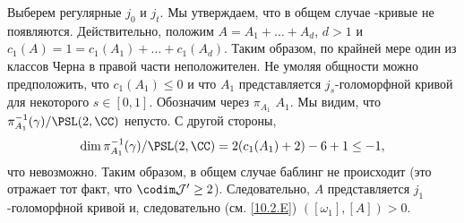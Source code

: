 Выберем регулярные $j_0$ и $j_t$.
Мы утверждаем, что в общем случае -кривые не появляются.
Действительно, положим $A = A_1 +\dots + A_d$, $d > 1$ и $c_1 (A) = 1 = c_1 (A_1) +\dots + c_1 (A_d)$.
Таким образом, по крайней мере один из классов Черна в правой части неположителен.
Не умоляя общности можно предположить, что $c_1 (A_1) \le 0$ и что $A_1$ представляется $j_s$-голоморфной кривой для некоторого $s \in [0, 1]$.
Обозначим через $\pi_{A_1}$  $A_1$.
Мы видим, что $\pi_{A_1}^{-1} (\gamma)/\PSL(2, \CC)$ непусто.
С другой стороны, 
\[\dim \pi_{A_1}^{-1} (\gamma)/\PSL(2, \CC) = 2(c_1 (A_1) + 2) - 6 + 1 \le -1,\]
что невозможно.
Таким образом, в общем случае баблинг не происходит (это отражает тот факт, что $\codim \mathcal{J}' \ge 2$).
Следовательно, $A$ представляется $j_1$-голоморфной кривой и, следовательно (см. \ref{10.2.E}) $([\omega_1], [A]) > 0$. 
